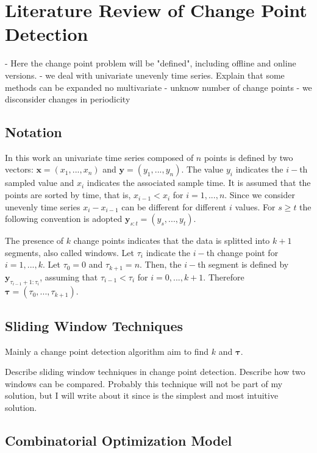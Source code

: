 \chapter{Literature Review of Change Point Detection} 

- Here the change point problem will be "defined", including offline and online versions.
- we deal with univariate unevenly time series. Explain that some methods can be expanded no multivariate
- unknow number of change points
- we disconsider changes in periodicity

\section{Notation}

In this work an univariate time series composed of $n$ points is defined by two vectors: $\mathbf{x} = (x_{1}, ..., x_{n})$ and $\mathbf{y} = (y_{1}, ..., y_{n})$. The value $y_{i}$ indicates the $i-$th sampled value and $x_{i}$ indicates the associated sample time. It is assumed that the points are sorted by time, that is, $x_{i - 1} < x_{i}$ for $i = 1, ..., n$. Since we consider unevenly time series $x_{i} - x_{i - 1}$ can be different for different $i$ values. For $s \ge t$ the following convention is adopted $\mathbf{y}_{s:t} = (y_{s}, ..., y_{t})$.

The presence of $k$ change points indicates that the data is splitted into $k+1$ segments, also called windows. Let $\tau_{i}$ indicate the $i-$th change point for $i=1,...,k$. Let $\tau_{0} = 0$ and $\tau_{k + 1} = n$. Then, the $i-$th segment is defined by $\mathbf{y}_{\tau_{i - 1} + 1 : \tau_{i}}$, assuming that $\tau_{i - 1} < \tau_{i}$ for $i = 0, ..., k + 1$. Therefore $\boldsymbol \tau = (\tau_{0}, ..., \tau_{k + 1})$.

\section{Sliding Window Techniques}

Mainly a change point detection algorithm aim to find $k$ and $\boldsymbol \tau$.

Describe sliding window techniques in change point detection. Describe how two windows can be compared. Probably this technique will not be part of my solution, but I will write about it since is the simplest and most intuitive solution.

\section{Combinatorial Optimization Model}  

